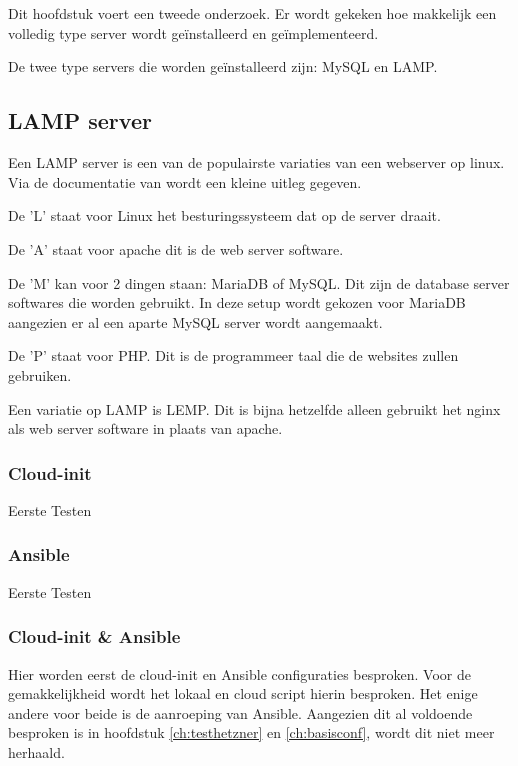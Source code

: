 \chapter{}
\label{ch:serverconf}
Dit hoofdstuk voert een tweede onderzoek. Er wordt gekeken hoe makkelijk een volledig type server wordt geïnstalleerd en geïmplementeerd. 

De twee type servers die worden geïnstalleerd zijn: MySQL en LAMP.

\section{LAMP server}
Een LAMP server is een van de populairste variaties van een webserver op linux. Via de documentatie van \autocite{lamp} wordt een kleine uitleg gegeven.
 
De 'L' staat voor Linux het besturingssysteem dat op de server draait. 

De 'A' staat voor apache dit is de web server software. 

De 'M' kan voor 2 dingen staan: MariaDB of MySQL. Dit zijn de database server softwares die worden gebruikt. In deze setup wordt gekozen voor MariaDB aangezien er al een aparte MySQL server wordt aangemaakt.

De 'P' staat voor PHP. Dit is de programmeer taal die de websites zullen gebruiken.

Een variatie op LAMP is LEMP. Dit is bijna hetzelfde alleen gebruikt het nginx als web server software in plaats van apache.


\subsection{Cloud-init}
Eerste Testen

\subsection{Ansible}
Eerste Testen

\subsection{Cloud-init \& Ansible}
\label{ch:cloudansiserverconf}
Hier worden eerst de cloud-init en Ansible configuraties besproken. Voor de gemakkelijkheid wordt het lokaal en cloud script hierin besproken. Het enige andere voor beide is de aanroeping van Ansible. Aangezien dit al voldoende besproken is in hoofdstuk \ref*{ch:testhetzner} en \ref*{ch:basisconf}, wordt dit niet meer herhaald. 

